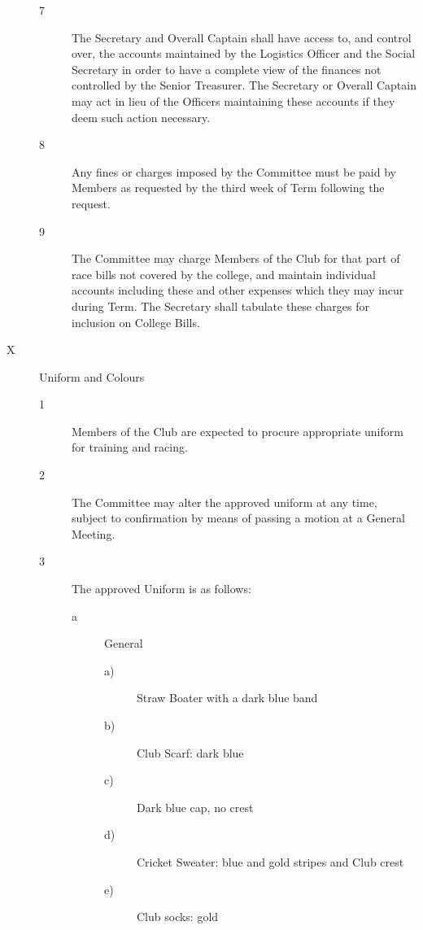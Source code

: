 \documentclass{article}
\begin{document}
\begin{description}
\begin{description}
		\item[7] The Secretary and Overall Captain shall have access to, and control over, the
		accounts maintained by the Logistics Officer and the Social Secretary in order
		to have a complete view of the finances not controlled by the Senior Treasurer.
		The Secretary or Overall Captain may act in lieu of the Officers maintaining
		these accounts if they deem such action necessary.\\
		
		\item[8] Any fines or charges imposed by the Committee must be paid by Members as
		requested by the third week of Term following the request.\\
		
		\item[9] The Committee may charge Members of the Club for that part of race bills not
		covered by the college, and maintain individual accounts including these and
		other expenses which they may incur during Term. The Secretary shall
		tabulate these charges for inclusion on College Bills.\\
		
	\end{description}

	\item[X] Uniform and Colours
	\begin{description}
		\item[1] Members of the Club are expected to procure appropriate uniform for training and racing.\\
		
		\item[2] The Committee may alter the approved uniform at any time, subject to
		confirmation by means of passing a motion at a General Meeting.\\
		
		\item[3] The approved Uniform is as follows:
		\begin{description}
			\item[a] General
			\begin{description}
				\item[a)] Straw Boater with a dark blue band
				\item[b)] Club Scarf: dark blue
				\item[c)] Dark blue cap, no crest
				\item[d)] Cricket Sweater: blue and gold stripes and Club crest
				\item[e)] Club socks: gold\\
			\end{description}
		

\end{description}
\end{description}
\end{description}
\end{document}
